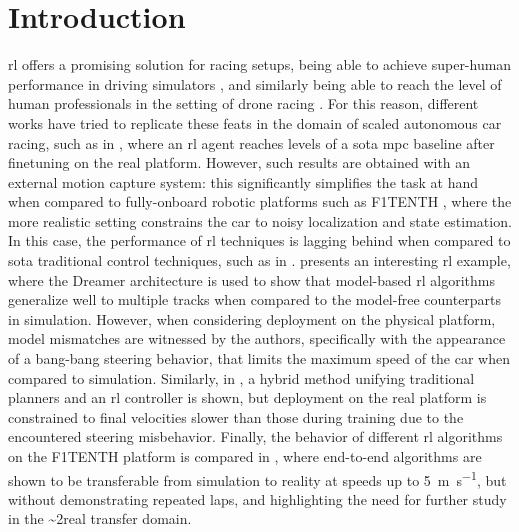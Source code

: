 \documentclass[letterpaper, conference]{IEEEtran}
\begin{document}



\setlength{\tabcolsep}{3pt}

\section{Introduction} \label{sec:intro}
\gls{rl} offers a promising solution for racing setups, being able to achieve super-human performance in driving simulators \cite{fuchs2021superhuman}, and similarly being able to reach the level of human professionals in the setting of drone racing \cite{champion_level}. 
For this reason, different works have tried to replicate these feats in the domain of scaled autonomous car racing, such as in \cite{chisari2021learning}, where an \gls{rl} agent reaches levels of a \gls{sota} \gls{mpc} baseline after finetuning on the real platform.
However, such results are obtained with an external motion capture system: this significantly simplifies the task at hand when compared to fully-onboard robotic platforms such as F1TENTH \cite{okelly2020f1tenthsim}, where the more realistic setting constrains the car to noisy localization and state estimation.
In this case, the performance of \gls{rl} techniques is lagging behind when compared to \gls{sota} traditional control techniques, such as in \cite{map}. 
 \cite{brunnbauer2022latent} presents an interesting \gls{rl} example, where the Dreamer architecture \cite{hafner2020dreamer} is used to show that model-based \gls{rl} algorithms generalize well to multiple tracks when compared to the model-free counterparts in simulation. However, when considering deployment on the physical platform, model mismatches are witnessed by the authors, specifically with the appearance of a bang-bang steering behavior, that limits the maximum speed of the car when compared to simulation.
Similarly, in \cite{Ghignone2023tcdriver}, a hybrid method unifying traditional planners and an \gls{rl} controller is shown, but deployment on the real platform is constrained to final velocities slower than those during training due to the encountered steering misbehavior. Finally, the behavior of different \gls{rl} algorithms on the F1TENTH platform is compared in \cite{EVANS2023comparing}, where end-to-end algorithms are shown to be transferable from simulation to reality at speeds up to \SI{5}{\metre \per \second}, but without demonstrating repeated laps, and highlighting the need for further study in the \sim2real transfer domain.
\end{document}
